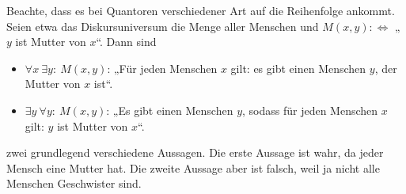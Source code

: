  
 \begin{bem} \label{quantortausch}
 Beachte, dass es bei Quantoren verschiedener Art auf die Reihenfolge ankommt. Seien etwa das Diskursuniversum die Menge aller Menschen und $M(x,y):\Leftrightarrow$ „$y$ ist Mutter von $x$“. Dann sind
 \begin{itemize}
  \item $\forall x\ \exists y:\ M(x,y)$: „Für jeden Menschen $x$ gilt: es gibt einen Menschen $y$, der Mutter von $x$ ist“.
  \item $\exists y\ \forall y:\ M(x,y)$: „Es gibt einen Menschen $y$, sodass für jeden Menschen $x$ gilt: $y$ ist Mutter von $x$“.
 \end{itemize}
zwei grundlegend verschiedene Aussagen. Die erste Aussage ist wahr, da jeder Mensch eine Mutter hat. Die zweite Aussage aber ist falsch, weil ja nicht alle Menschen Geschwister sind. %
\end{bem}



